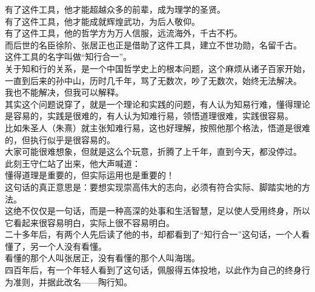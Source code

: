 \begin{multicols}{\theparacolNo}
有了这件工具，他才能超越众多的前辈，成为理学的圣贤。\\

有了这件工具，他才能成就辉煌武功，为后人敬仰。\\

有了这件工具，他的哲学方为万人信服，远流海外，千古不朽。\\

而后世的名臣徐阶、张居正也正是借助了这件工具，建立不世功勋，名留千古。\\

这件工具的名字叫做“知行合一”。\\

关于知和行的关系，是一个中国哲学史上的根本问题，这个麻烦从诸子百家开始，一直到后来的孙中山，历时几千年，骂了无数次，吵了无数次，始终无法解决。\\

我也不能解决，但我可以解释。\\

其实这个问题说穿了，就是一个理论和实践的问题，有人认为知易行难，懂得理论是容易的，实践是很难的，有人认为知难行易，领悟道理很难，实践很容易。\\

比如朱圣人（朱熹）就主张知难行易，这也好理解，按照他那个格法，悟道是很难的，但执行似乎是很容易的。\\

大家可能很难想象，但就是这么个玩意，折腾了上千年，直到今天，都没停过。\\

此刻王守仁站了出来，他大声喊道：\\

懂得道理是重要的，但实际运用也是重要的！\\

这句话的真正意思是：要想实现崇高伟大的志向，必须有符合实际、脚踏实地的方法。\\

这绝不仅仅是一句话，而是一种高深的处事和生活智慧，足以使人受用终身，所以它看起来很容易明白，实际上很不容易明白。\\

二十多年后，有两个人先后读了他的书，却都看到了“知行合一”这句话，一个人看懂了，另一个人没有看懂。\\

看懂的那个人叫张居正，没有看懂的那个人叫海瑞。\\

四百年后，有一个年轻人看到了这句话，佩服得五体投地，以此作为自己的终身行为准则，并据此改名——陶行知。\\


\end{multicols}
